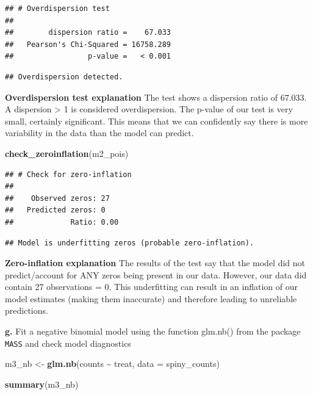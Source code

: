 \documentclass[
]{article}
\newenvironment{Shaded}{\begin{snugshade}}{\end{snugshade}}
\newcommand{\AttributeTok}[1]{\textcolor[rgb]{0.13,0.29,0.53}{#1}}
\newcommand{\FunctionTok}[1]{\textcolor[rgb]{0.13,0.29,0.53}{\textbf{#1}}}
\newcommand{\NormalTok}[1]{#1}
\newcommand{\OtherTok}[1]{\textcolor[rgb]{0.56,0.35,0.01}{#1}}
\newcommand{\SpecialCharTok}[1]{\textcolor[rgb]{0.81,0.36,0.00}{\textbf{#1}}}
\begin{document}
\begin{verbatim}
## # Overdispersion test
## 
##        dispersion ratio =    67.033
##   Pearson's Chi-Squared = 16758.289
##                 p-value =   < 0.001
\end{verbatim}

\begin{verbatim}
## Overdispersion detected.
\end{verbatim}

\textbf{Overdispersion test explanation} The test shows a dispersion
ratio of 67.033. A dispersion \textgreater{} 1 is considered
overdispersion. The p-value of our test is very small, certainly
significant. This means that we can confidently say there is more
variability in the data than the model can predict.

\begin{Shaded}
\begin{Highlighting}[]
\FunctionTok{check\_zeroinflation}\NormalTok{(m2\_pois)}
\end{Highlighting}
\end{Shaded}

\begin{verbatim}
## # Check for zero-inflation
## 
##    Observed zeros: 27
##   Predicted zeros: 0
##             Ratio: 0.00
\end{verbatim}

\begin{verbatim}
## Model is underfitting zeros (probable zero-inflation).
\end{verbatim}

\textbf{Zero-inflation explanation} The results of the test say that the
model did not predict/account for ANY zeros being present in our data.
However, our data did contain 27 observations = 0. This underfitting can
result in an inflation of our model estimates (making them inaccurate)
and therefore leading to unreliable predictions.

\textbf{g.} Fit a negative binomial model using the function glm.nb()
from the package \texttt{MASS} and check model diagnostics

\begin{Shaded}
\begin{Highlighting}[]
\NormalTok{m3\_nb }\OtherTok{\textless{}{-}} \FunctionTok{glm.nb}\NormalTok{(counts }\SpecialCharTok{\textasciitilde{}}\NormalTok{ treat,}
                \AttributeTok{data =}\NormalTok{ spiny\_counts)}

\FunctionTok{summary}\NormalTok{(m3\_nb)}
\end{Highlighting}
\end{Shaded}
\end{document}

